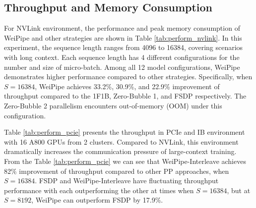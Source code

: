 \documentclass[sigplan,review,anonymous]{acmart}
\begin{document}
\subsection{Throughput and Memory Consumption}

For NVLink environment, the performance and peak memory consumption of WeiPipe and other strategies are shown in Table \ref{tab:perform_nvlink}. In this experiment, the sequence length ranges from 4096 to 16384, covering scenarios with long context. Each sequence length has 4 different configurations for the number and size of micro-batch. Among all 12 model configurations, WeiPipe demonstrates higher performance compared to other strategies. Specifically, when $S=16384$, WeiPipe achieves 33.2\%, 30.9\%, and 22.9\% improvement of throughput compared to the 1F1B, Zero-Bubble 1, and FSDP respectively. The Zero-Bubble 2 parallelism encounters out-of-memory (OOM) under this configuration. 

Table \ref{tab:perform_pcie} presents the throughput in PCIe and IB environment with 16 A800 GPUs from 2 clusters. Compared to NVLink, this environment dramatically increases the communication pressure of large-context training. From the Table \ref{tab:perform_pcie} we can see that WeiPipe-Interleave achieves 82\% improvement of throughput compared to other PP approaches, when $S=16384$. FSDP and WeiPipe-Interleave have fluctuating throughput performance with each outperforming the other at times when $S=16384$, but at $S=8192$, WeiPipe can outperform FSDP by 17.9\%.



\end{document}
